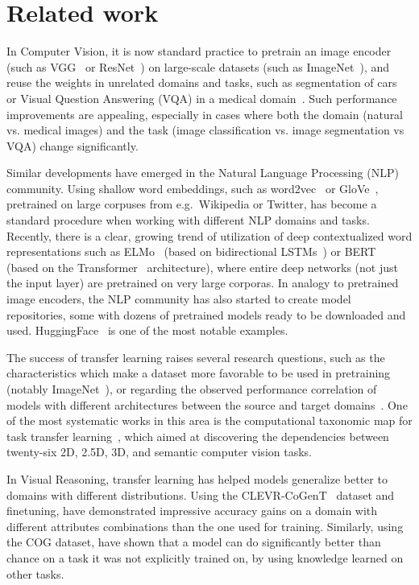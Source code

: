 \section{Related work}
\label{sec:related_work}

In Computer Vision, it is now standard practice to pretrain an image encoder (such as VGG~\cite{simonyan2014very} or ResNet~\cite{he2016deep}) on large-scale datasets (such as ImageNet~\cite{deng2009imagenet}), and reuse the weights in unrelated domains and tasks, such as segmentation of cars~\cite{iglovikov2018ternausnet} or Visual Question Answering (VQA) in a medical domain~\cite{kornuta2019leveraging}.
Such performance improvements are appealing, especially in cases where both the domain (natural vs. medical images) and the task (image classification vs. image segmentation vs VQA) change significantly.

Similar developments have emerged in the Natural Language Processing (NLP) community.
Using shallow word embeddings, such as word2vec~\cite{mikolov2013distributed} or GloVe~\cite{pennington2014glove}, pretrained on large corpuses from e.g.\ Wikipedia or Twitter, has become a standard procedure when working with different NLP domains and tasks.
Recently, there is a clear, growing trend of utilization of deep contextualized word representations such as ELMo~\cite{peters2018deep} (based on bidirectional LSTMs~\cite{hochreiter1997long}) or BERT~\cite{devlin2018bert} (based on the Transformer~\cite{vaswani2017attention} architecture), where entire deep networks (not just the input layer) are pretrained on very large corporas.
In analogy to pretrained image encoders, the NLP community has also started to create model repositories, some with dozens of pretrained models ready to be downloaded and used. HuggingFace~\cite{wolf2019transformers} is one of the most notable examples.

The success of transfer learning raises several research questions, such as the characteristics which make a dataset more favorable to be used in pretraining (notably ImageNet~\cite{huh2016makes}), or regarding the observed performance correlation of models with different architectures between the source and target domains~\cite{kornblith2019better}.
One of the most systematic works in this area is the computational taxonomic map for task transfer learning~\cite{zamir2018taskonomy}, which aimed at discovering the dependencies between twenty-six 2D, 2.5D, 3D, and semantic computer vision tasks.

In Visual Reasoning, transfer learning has helped models generalize better to domains with different distributions. Using the CLEVR-CoGenT~\cite{johnson2017clevr} dataset and finetuning, \cite{mascharka2018transparency, perez2018film, johnson2017inferring} have demonstrated impressive accuracy gains on a domain with different attributes combinations than the one used for training. Similarly, using the COG dataset, \cite{yang2018dataset} have shown that a model can do significantly better than chance on a task it was not explicitly trained on, by using knowledge learned on other tasks.

